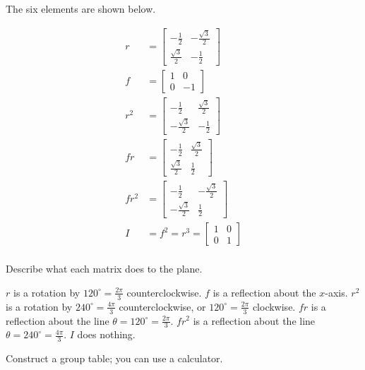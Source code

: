 \documentclass[../key.tex]{subfiles}
\begin{document}
The six elements are shown below.

\begin{align*}
r &= \begin{bmatrix} -\frac{1}{2} & -\frac{\sqrt{3}}{2} \\ \frac{\sqrt{3}}{2} & -\frac{1}{2} \end{bmatrix} \\
f &= \begin{bmatrix} 1 & 0 \\ 0 & -1 \end{bmatrix} \\
r^2 &= \begin{bmatrix} -\frac{1}{2} & \frac{\sqrt{3}}{2} \\ -\frac{\sqrt{3}}{2} & -\frac{1}{2} \end{bmatrix} \\
fr &= \begin{bmatrix} -\frac{1}{2} & \frac{\sqrt{3}}{2} \\ \frac{\sqrt{3}}{2} & \frac{1}{2} \end{bmatrix} \\
fr^2 &= \begin{bmatrix} -\frac{1}{2} & -\frac{\sqrt{3}}{2} \\ -\frac{\sqrt{3}}{2} & \frac{1}{2} \end{bmatrix} \\
I &= f^2 = r^3 = \begin{bmatrix} 1 & 0 \\ 0 & 1 \end{bmatrix} \\
\end{align*}

\begin{iinner_problem}
\item Describe what each matrix does to the plane.
\end{iinner_problem}

$r$ is a rotation by $120^\circ = \frac{2\pi}{3}$ counterclockwise. $f$ is a reflection about the $x$-axis. $r^2$ is a rotation by $240^\circ = \frac{4\pi}{3}$ counterclockwise, or $120^\circ = \frac{2\pi}{3}$ clockwise. $fr$ is a reflection about the line $\theta = 120^\circ = \frac{2\pi}{3}$. $fr^2$ is a reflection about the line $\theta=240^\circ=\frac{4\pi}{3}$. $I$ does nothing.

\begin{iinner_problem}
\item Construct a group table; you can use a calculator.
\end{iinner_problem}
\end{document}
